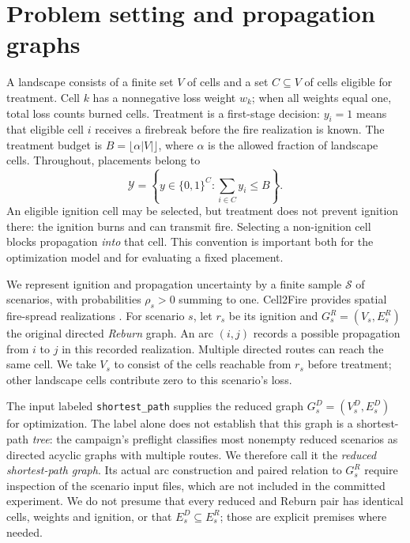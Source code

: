 \section{Problem setting and propagation graphs}\label{sec:setting}

A landscape consists of a finite set $V$ of cells and a set $C\subseteq V$ of
cells eligible for treatment. Cell $k$ has a nonnegative loss weight $w_k$;
when all weights equal one, total loss counts burned cells. Treatment is a
first-stage decision: $y_i=1$ means that eligible cell $i$ receives a
firebreak before the fire realization is known. The treatment budget is
$B=\lfloor\alpha |V|\rfloor$, where $\alpha$ is the allowed fraction of
landscape cells. Throughout, placements belong to
\begin{equation}\label{eq:placements}
 \mathcal Y=\left\{y\in\{0,1\}^{C}:\sum_{i\in C}y_i\le B\right\}.
\end{equation}
An eligible ignition cell may be selected, but treatment does not prevent
ignition there: the ignition burns and can transmit fire. Selecting a
non-ignition cell blocks propagation \emph{into} that cell. This convention
is important both for the optimization model and for evaluating a fixed
placement.

We represent ignition and propagation uncertainty by a finite sample
$\mathcal S$ of scenarios, with probabilities $\rho_s>0$ summing to one.
Cell2Fire provides spatial fire-spread realizations
\citep{pais2021cell2fire}. For scenario $s$, let $r_s$ be its ignition
and $G_s^R=(V_s,E_s^R)$ the original directed \emph{Reburn} graph. An arc
$(i,j)$ records a possible propagation from $i$ to $j$ in this recorded
realization. Multiple directed routes can reach the same cell. We take
$V_s$ to consist of the cells reachable from $r_s$ before treatment; other
landscape cells contribute zero to this scenario's loss.

The input labeled \texttt{shortest\_path} supplies the reduced graph
$G_s^D=(V_s^D,E_s^D)$ for optimization. The label alone does not establish
that this graph is a shortest-path \emph{tree}: the campaign's preflight
classifies most nonempty reduced scenarios as directed acyclic graphs
with multiple routes. We therefore call it the \emph{reduced
shortest-path graph}. Its actual arc construction and paired relation to
$G_s^R$ require inspection of the scenario input files, which are not
included in the committed experiment. We do not presume that every
reduced and Reburn pair has identical cells, weights and ignition, or
that $E_s^D\subseteq E_s^R$; those are explicit premises where needed.

